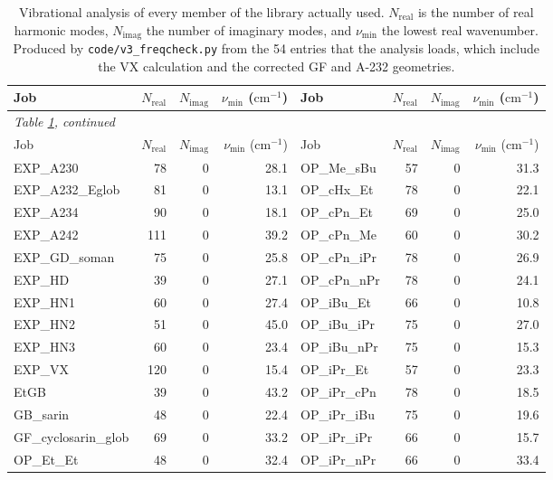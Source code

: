 \documentclass[11pt]{article}
\newcommand*\wn{\ensuremath{\text{cm}^{-1}}}
\begin{document}
{\footnotesize
{\footnotesize
\begin{longtable}{lrrr|lrrr}
\caption{Vibrational analysis of every member of the library actually used. $N_\mathrm{real}$
is the number of real harmonic modes, $N_\mathrm{imag}$ the number of imaginary modes, and
$\nu_\mathrm{min}$ the lowest real wavenumber. Produced by \texttt{code/v3\_freqcheck.py}
from the 54 entries that the analysis loads, which include the VX calculation and the
corrected GF and A-232 geometries.}\label{tab:si-freq}\\
\toprule
Job & $N_\mathrm{real}$ & $N_\mathrm{imag}$ & $\nu_\mathrm{min}$ (\wn) & Job & $N_\mathrm{real}$ & $N_\mathrm{imag}$ & $\nu_\mathrm{min}$ (\wn) \\
\midrule
\endfirsthead
\multicolumn{8}{l}{\footnotesize\emph{Table \ref{tab:si-freq}, continued}}\\
\toprule
Job & $N_\mathrm{real}$ & $N_\mathrm{imag}$ & $\nu_\mathrm{min}$ (\wn) & Job & $N_\mathrm{real}$ & $N_\mathrm{imag}$ & $\nu_\mathrm{min}$ (\wn) \\
\midrule
\endhead
\bottomrule
\endfoot
EXP\_A230 & 78 & 0 & 28.1 & OP\_Me\_sBu & 57 & 0 & 31.3 \\
EXP\_A232\_Eglob & 81 & 0 & 13.1 & OP\_cHx\_Et & 78 & 0 & 22.1 \\
EXP\_A234 & 90 & 0 & 18.1 & OP\_cPn\_Et & 69 & 0 & 25.0 \\
EXP\_A242 & 111 & 0 & 39.2 & OP\_cPn\_Me & 60 & 0 & 30.2 \\
EXP\_GD\_soman & 75 & 0 & 25.8 & OP\_cPn\_iPr & 78 & 0 & 26.9 \\
EXP\_HD & 39 & 0 & 27.1 & OP\_cPn\_nPr & 78 & 0 & 24.1 \\
EXP\_HN1 & 60 & 0 & 27.4 & OP\_iBu\_Et & 66 & 0 & 10.8 \\
EXP\_HN2 & 51 & 0 & 45.0 & OP\_iBu\_iPr & 75 & 0 & 27.0 \\
EXP\_HN3 & 60 & 0 & 23.4 & OP\_iBu\_nPr & 75 & 0 & 15.3 \\
EXP\_VX & 120 & 0 & 15.4 & OP\_iPr\_Et & 57 & 0 & 23.3 \\
EtGB & 39 & 0 & 43.2 & OP\_iPr\_cPn & 78 & 0 & 18.5 \\
GB\_sarin & 48 & 0 & 22.4 & OP\_iPr\_iBu & 75 & 0 & 19.6 \\
GF\_cyclosarin\_glob & 69 & 0 & 33.2 & OP\_iPr\_iPr & 66 & 0 & 15.7 \\
OP\_Et\_Et & 48 & 0 & 32.4 & OP\_iPr\_nPr & 66 & 0 & 33.4 \\

\end{longtable}}}
\end{document}
